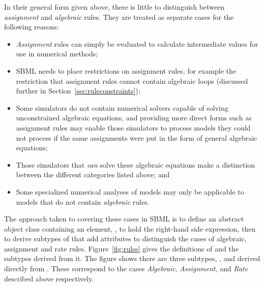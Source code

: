 In their general form given above, there is little to distinguish
between \emph{assignment} and \emph{algebraic} rules.  They are
treated as separate cases for the following reasons:
\begin{itemize}
  
\item \emph{Assignment} rules can simply be evaluated to calculate
  intermediate values for use in numerical methods;
  
\item SBML needs to place restrictions on assignment rules, for
  example the restriction that assignment rules cannot contain
  algebraic loops (discussed further in
  Section~\ref{sec:ruleconstraints});

\item Some simulators do not contain numerical solvers capable of
  solving unconstrained algebraic equations, and providing more
  direct forms such as assignment rules may enable those
  simulators to process models they could not process if the same
  assignments were put in the form of general algebraic equations;
  
\item Those simulators that \emph{can} solve these algebraic
  equations make a distinction between the different categories
  listed above; and
  
\item Some specialized numerical analyses of models may only be
  applicable to models that do not contain \emph{algebraic} rules.

\end{itemize}

The approach taken to covering these cases in SBML is to define an
abstract \Rule object class containing an element,
, to hold the right-hand side expression, then to
derive subtypes of \Rule that add attributes to
distinguish the cases of algebraic, assignment and rate rules.
Figure~\vref{fig:rules} gives the definitions of \Rule and the
subtypes derived from it.  The figure shows there are three
subtypes, \AlgebraicRule, \AssignmentRule and \RateRule derived
directly from \Rule. These correspond to the cases
\emph{Algebraic}, \emph{Assignment}, and \emph{Rate} described
above respectively.


